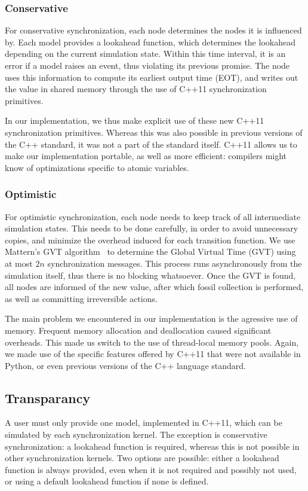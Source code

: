 \subsubsection{Conservative}
For conservative synchronization, each node determines the nodes it is influenced by.
Each model provides a lookahead function, which determines the lookahead depending on the current simulation state.
Within this time interval, it is an error if a model raises an event, thus violating its previous promise.
The node uses this information to compute its earliest output time (EOT), and writes out the value in shared memory through the use of C++11 synchronization primitives.

In our implementation, we thus make explicit use of these new C++11 synchronization primitives.
Whereas this was also possible in previous versions of the C++ standard, it was not a part of the standard itself.
C++11 allows us to make our implementation portable, as well as more efficient: compilers might know of optimizations specific to atomic variables.

\subsubsection{Optimistic}
For optimistic synchronization, each node needs to keep track of all intermediate simulation states.
This needs to be done carefully, in order to avoid unnecessary copies, and minimize the overhead induced for each transition function.
We use Mattern's GVT algorithm~\cite{mattern} to determine the Global Virtual Time (GVT) using at most $2n$ synchronization messages.
This process runs asynchronously from the simulation itself, thus there is no blocking whatsoever.
Once the GVT is found, all nodes are informed of the new value, after which fossil collection is performed, as well as committing irreversible actions.

The main problem we encountered in our implementation is the agressive use of memory.
Frequent memory allocation and deallocation caused significant overheads.
This made us switch to the use of thread-local memory pools.
Again, we made use of the specific features offered by C++11 that were not available in Python, or even previous versions of the C++ language standard.

\subsection{Transparancy}
A user must only provide one model, implemented in C++11, which can be simulated by each synchronization kernel.
The exception is conservative synchronization: a lookahead function is required, whereas this is not possible in other synchronization kernels.
Two options are possible: either a lookahead function is always provided, even when it is not required and possibly not used, or using a default lookahead function if none is defined.

